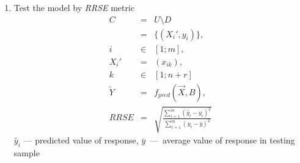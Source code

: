 \documentclass{beamer}
\newcounter{saveenumi}
\newcommand{\seti}{\setcounter{saveenumi}{\value{enumi}}}
\newcommand{\conti}{\setcounter{enumi}{\value{saveenumi}}}
\begin{document}
\begin{frame}
	\begin{enumerate}
		\conti
		\item Test the model by \textit{RRSE} metric
			\begin{eqnarray}
				C &=& U \setminus D \\
				  &=& \{ (X_i', y_i) \}, \\
				i &\in & [1;m], \\
				X_i' &=& (x_{ik}), \\
				k &\in & [1;n+r] \\
				\tilde{Y} &=& f_{pred} (\vec{X}, B), \\
				RRSE &=& \sqrt{ \frac{ \sum\limits_{i=1}^m { ( \tilde{y_i}-y_i )^2 } }
				                     { \sum\limits_{i=1}^m { ( y_i - \bar{y} )^2 } } }
			\end{eqnarray}
		$\tilde{y_i}$ --- predicted value of response, $\bar{y}$~---~average value of response in testing sample
		\seti
	\end{enumerate}
\end{frame}
\end{document}
